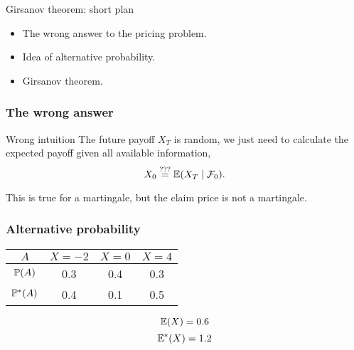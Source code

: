 
\begin{frame} %

    
    \end{frame}
    
    
    \begin{frame}{Girsanov theorem: short plan}
    
      \begin{itemize}[<+->]
        \item The \alert{wrong answer} to the pricing problem. 
        \item Idea of \alert{alternative probability}. 
        \item \alert{Girsanov theorem}.
      \end{itemize}
    
    \end{frame}

\begin{frame}
  \frametitle{The wrong answer}

  \begin{block}{Wrong intuition \harlequinduck}
    The future payoff $X_T$ is random, we just need to calculate the expected payoff
    given all available information,
    \[
    X_0 \stackrel{???}{=} \E(X_T \mid \mathcal F_0).
    \]
  \end{block}

  \pause 
  This is true for a martingale, but the claim price is \alert{not a martingale}. 

\end{frame}


\begin{frame}
  \frametitle{Alternative probability}
  \begin{center}
  \begin{tabular}{@{}cccc@{}}
    \toprule
     $A$ & $X=-2$ & $X=0$ & $X=4$  \\ 
     \midrule
     $\P(A)$ & 0.3 & 0.4 & 0.3  \\
     $\P^*(A)$ & 0.4 & 0.1 & 0.5 \\
     \bottomrule
    \end{tabular}
  \end{center}

  \pause
  \[
    \E(X) = 0.6
  \]
  \pause
  \[
    \E^*(X) = 1.2
  \]
\end{frame}

